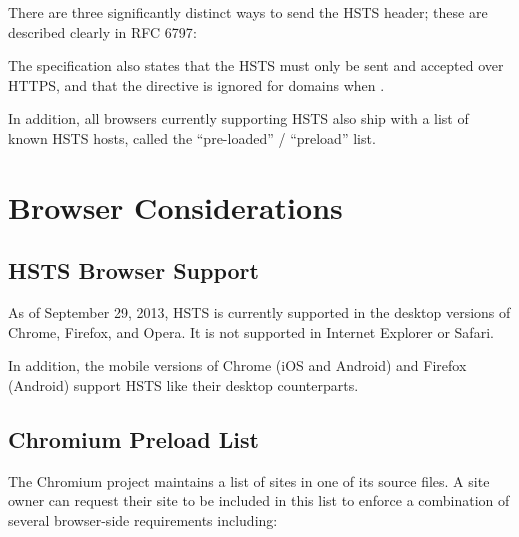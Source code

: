 \documentclass{acm_proc_article-sp}
\begin{document}
{There are three significantly distinct ways to send the HSTS header; these are described clearly in RFC 6797\cite{rfc}:

{}
{}
{}

The specification also states that the HSTS must only be sent and accepted over HTTPS, and that the {\iSD} directive is ignored for domains when .

In addition, all browsers currently supporting HSTS also ship with a list of known HSTS hosts, called the ``pre-loaded'' / ``preload'' list.

\section{Browser Considerations}
\firstsubsectionskip
\subsection{HSTS Browser Support}

As of September 29, 2013, HSTS is currently supported in the desktop versions of Chrome, Firefox, and Opera. It is not supported in Internet Explorer or Safari.\cite{support}

In addition, the mobile versions of Chrome (iOS and Android) and Firefox (Android) support HSTS like their desktop counterparts\cite{mdn}.

\subsection{Chromium Preload List}

The Chromium project maintains a list of sites in one of its source files\cite{sts-list}. A site owner can request their site to be included in this list to enforce a combination of several browser-side requirements including:

}
\end{document}
